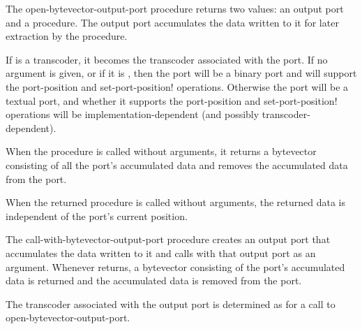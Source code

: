 \begin{entry}{%
}


The {\cf open-bytevector-output-port} procedure returns 
two values: an output port and a procedure.
The output port accumulates the data written to it for
later extraction by the procedure.

If  is a transcoder, it becomes
the transcoder associated with the port.
If no  argument is given, or
if it is \schfalse,
then the port will be a binary port and will support the
{\cf port-position} and {\cf set-port-position!}  operations.
Otherwise the port will be a textual port, and whether it supports
the {\cf port-position} and {\cf set-port-position!} operations
will be implementation-dependent (and possibly transcoder-dependent).

When the procedure is called without arguments, it returns a
bytevector consisting of all the port's accumulated data and removes
the accumulated data from the port.

\begin{note}
  When the returned procedure is called without arguments, the
  returned data is independent of the port's current position.
\end{note}
\end{entry}

\begin{entry}{%
}


The {\cf call-with-bytevector-output-port} procedure creates an output
port that accumulates the data written to it and calls  with
that output port as an argument. Whenever  returns, a
bytevector consisting of the port's accumulated data is returned and
the accumulated data is removed from the port.

The transcoder associated with the output port is determined
as for a call to {\cf open-bytevector-output-port}.
\end{entry}

